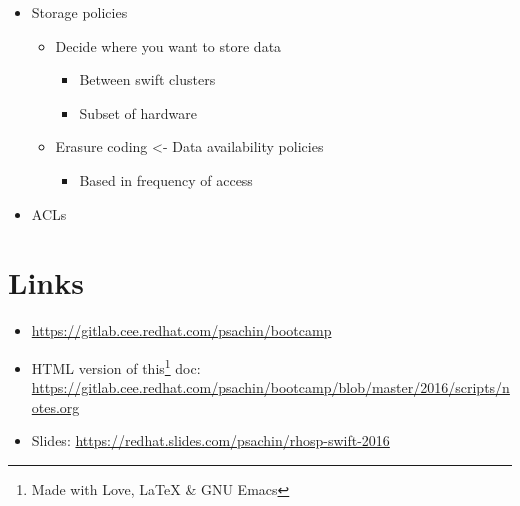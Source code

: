 \documentclass{article}
\begin{document}
\begin{itemize}
\item Storage policies
\begin{itemize}
\item Decide where you want to store data
\begin{itemize}
\item Between swift clusters
\item Subset of hardware
\end{itemize}
\item Erasure coding <- Data availability policies
\begin{itemize}
\item Based in frequency of access
\end{itemize}
\end{itemize}

\item ACLs
\end{itemize}

\section{Links}
\label{sec-5}
\begin{itemize}
\item \url{https://gitlab.cee.redhat.com/psachin/bootcamp}
\item HTML version of this\footnote[1]{Made with Love, LaTeX \& GNU Emacs} doc:
\url{https://gitlab.cee.redhat.com/psachin/bootcamp/blob/master/2016/scripts/notes.org}
\item Slides: \url{https://redhat.slides.com/psachin/rhosp-swift-2016}
\end{itemize}
\end{document}

